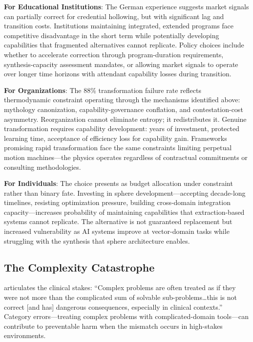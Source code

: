 \textbf{For Educational Institutions}: The German experience suggests market signals can partially correct for credential hollowing, but with significant lag and transition costs. Institutions maintaining integrated, extended programs face competitive disadvantage in the short term while potentially developing capabilities that fragmented alternatives cannot replicate. Policy choices include whether to accelerate correction through program-duration requirements, synthesis-capacity assessment mandates, or allowing market signals to operate over longer time horizons with attendant capability losses during transition.

\textbf{For Organizations}: The 88\% transformation failure rate \citep{bain2024} reflects thermodynamic constraint operating through the mechanisms identified above: mythology canonization, capability-governance conflation, and contestation-cost asymmetry. Reorganization cannot eliminate entropy; it redistributes it. Genuine transformation requires capability development: years of investment, protected learning time, acceptance of efficiency loss for capability gain. Frameworks promising rapid transformation face the same constraints limiting perpetual motion machines—the physics operates regardless of contractual commitments or consulting methodologies.

\textbf{For Individuals}: The choice presents as budget allocation under constraint rather than binary fate. Investing in sphere development—accepting decade-long timelines, resisting optimization pressure, building cross-domain integration capacity—increases probability of maintaining capabilities that extraction-based systems cannot replicate. The alternative is not guaranteed replacement but increased vulnerability as AI systems improve at vector-domain tasks while struggling with the synthesis that sphere architecture enables.

\subsection{The Complexity Catastrophe}

\citet{kempermann2017} articulates the clinical stakes: ``Complex problems are often treated as if they were not more than the complicated sum of solvable sub-problems\ldots this is not correct [and has] dangerous consequences, especially in clinical contexts.'' Category errors—treating complex problems with complicated-domain tools—can contribute to preventable harm when the mismatch occurs in high-stakes environments.

